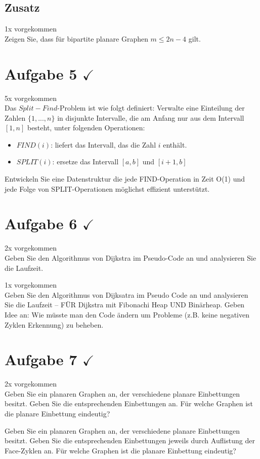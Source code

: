 \documentclass[10pt,a4paper]{article}
\begin{document}
\subsection*{Zusatz}
	1x vorgekommen \\
	Zeigen Sie, dass für bipartite planare Graphen $m\leq2n-4$ gilt.
	
\section*{Aufgabe 5 $\checkmark$}
	5x vorgekommen \\
	Das $Split-Find$-Problem ist wie folgt definiert: Verwalte eine Einteilung der Zahlen $\{1,...,n\}$ in disjunkte Intervalle, die am Anfang nur aus dem Intervall $[1,n]$ besteht, unter folgenden Operationen:
	\begin{itemize}
		\item $FIND(i)$: liefert das Intervall, das die Zahl $i$ enthält.
		\item $SPLIT(i)$: ersetze das Intervall $[a,b]$ und $[i+1,b]$
	\end{itemize}
	Entwickeln Sie eine Datenstruktur die jede FIND-Operation in Zeit O(1) und jede Folge von SPLIT-Operationen möglichst effizient unterstützt.
	
\section*{Aufgabe 6 $\checkmark$} 
	2x vorgekommen \\
	Geben Sie den Algorithmus von Dijkstra im Pseudo-Code an und analysieren Sie die Laufzeit.
	
	1x vorgekommen \\
	Geben Sie den Algorithmus von Dijksatra im Pseudo Code an und analysieren Sie die Laufzeit – FÜR Dijkstra mit Fibonachi Heap UND Binärheap.  Geben Idee an: Wie müsste man den Code ändern um Probleme (z.B. keine negativen Zyklen Erkennung) zu beheben.
	
\section*{Aufgabe 7 $\checkmark$} 
	2x vorgekommen \\
	Geben Sie ein planaren Graphen an, der verschiedene planare Einbettungen besitzt. Geben Sie die entsprechenden Einbettungen an. Für welche Graphen ist die planare Einbettung eindeutig?
	
	Geben Sie ein planaren Graphen an, der verschiedene planare Einbettungen besitzt. Geben Sie die entsprechenden Einbettungen jeweils durch Auflistung der Face-Zyklen an. Für welche Graphen ist die planare Einbettung eindeutig?
	
\end{document}
